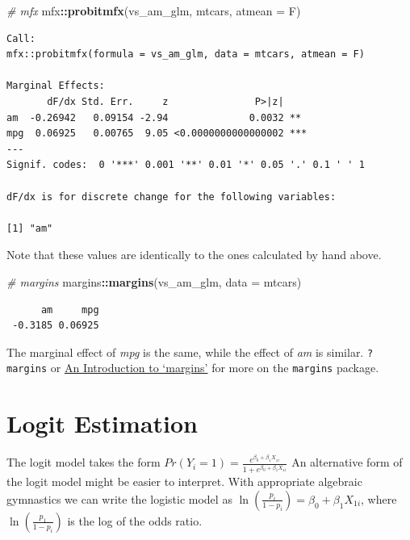 \documentclass[]{book}
\newenvironment{Shaded}{\begin{snugshade}}{\end{snugshade}}
\newcommand{\CommentTok}[1]{\textcolor[rgb]{0.56,0.35,0.01}{\textit{#1}}}
\newcommand{\DataTypeTok}[1]{\textcolor[rgb]{0.13,0.29,0.53}{#1}}
\newcommand{\KeywordTok}[1]{\textcolor[rgb]{0.13,0.29,0.53}{\textbf{#1}}}
\newcommand{\NormalTok}[1]{#1}
\newcommand{\OperatorTok}[1]{\textcolor[rgb]{0.81,0.36,0.00}{\textbf{#1}}}
\begin{document}
\begin{Shaded}
\begin{Highlighting}[]
\CommentTok{# mfx}
\NormalTok{mfx}\OperatorTok{::}\KeywordTok{probitmfx}\NormalTok{(vs_am_glm, mtcars, }\DataTypeTok{atmean =}\NormalTok{ F)}
\end{Highlighting}
\end{Shaded}

\begin{verbatim}
Call:
mfx::probitmfx(formula = vs_am_glm, data = mtcars, atmean = F)

Marginal Effects:
       dF/dx Std. Err.     z               P>|z|    
am  -0.26942   0.09154 -2.94              0.0032 ** 
mpg  0.06925   0.00765  9.05 <0.0000000000000002 ***
---
Signif. codes:  0 '***' 0.001 '**' 0.01 '*' 0.05 '.' 0.1 ' ' 1

dF/dx is for discrete change for the following variables:

[1] "am"
\end{verbatim}

Note that these values are identically to the ones calculated by hand above.

\begin{Shaded}
\begin{Highlighting}[]
\CommentTok{# margins}
\NormalTok{margins}\OperatorTok{::}\KeywordTok{margins}\NormalTok{(vs_am_glm, }\DataTypeTok{data =}\NormalTok{ mtcars)}
\end{Highlighting}
\end{Shaded}

\begin{verbatim}
      am     mpg
 -0.3185 0.06925
\end{verbatim}

The marginal effect of \emph{mpg} is the same, while the effect of \emph{am} is similar. \texttt{?margins} or \href{https://cran.r-project.org/web/packages/margins/vignettes/Introduction.html\#references}{An Introduction to `margins'} for more on the \texttt{margins} package.

\hypertarget{logit-estimation}{%
\section{Logit Estimation}\label{logit-estimation}}

The logit model takes the form \(Pr(Y_i=1)=\frac{e^{\beta_0+\beta_1X_{1i}}}{1+e^{\beta_0+\beta_1X_{1i}}}\) An alternative form of the logit model might be easier to interpret. With appropriate algebraic gymnastics we can write the logistic model as \(\ln(\frac{p_i}{1-p_i})=\beta_0+\beta_1X_{1i}\), where \(\ln(\frac{p_1}{1-p_i})\) is the log of the odds ratio.
\end{document}

